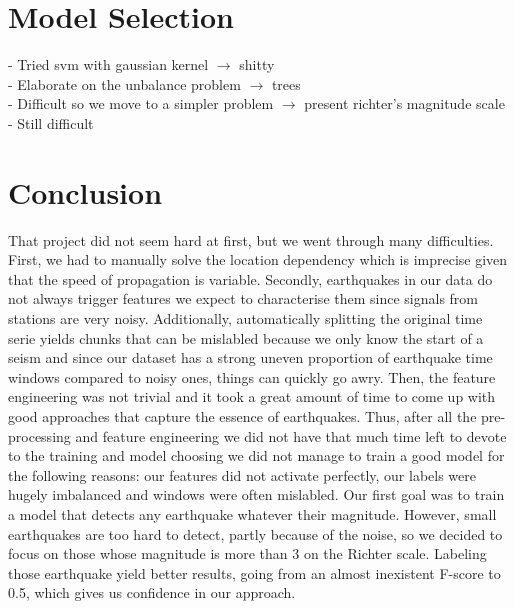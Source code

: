 \documentclass[10pt,conference,compsocconf]{IEEEtran}
\begin{document}
\section{Model Selection}
- Tried svm with gaussian kernel $\rightarrow$ shitty\\
- Elaborate on the unbalance problem $\rightarrow$ trees\\
- Difficult so we move to a simpler problem $\rightarrow$ present richter's magnitude scale\\
- Still difficult\\

\section{Conclusion}
That project did not seem hard at first, but we went through many difficulties. First, we had to manually solve the location dependency which is imprecise given that the speed of propagation is variable. Secondly, earthquakes in our data do not always trigger features we expect to characterise them since signals from stations are very noisy. Additionally, automatically splitting the original time serie yields chunks that can be mislabled because we only know the start of a seism and since our dataset has a strong uneven proportion of earthquake time windows compared to noisy ones, things can quickly go awry. Then, the feature engineering was not trivial and it took a great amount of time to come up with good approaches that capture the essence of earthquakes.\newline
Thus, after all the pre-processing and feature engineering we did not have that much time left to devote to the training and model choosing we did not manage to train a good model for the following reasons: our features did not activate perfectly, our labels were hugely imbalanced and windows were often mislabled. Our first goal was to train a model that detects any earthquake whatever their magnitude. However, small earthquakes are too hard to detect, partly because of the noise, so we decided to focus on those whose magnitude is more than $3$ on the Richter scale. Labeling those earthquake yield better results, going from an almost inexistent F-score to 0.5, which gives us confidence in our approach.\newline
\end{document}
